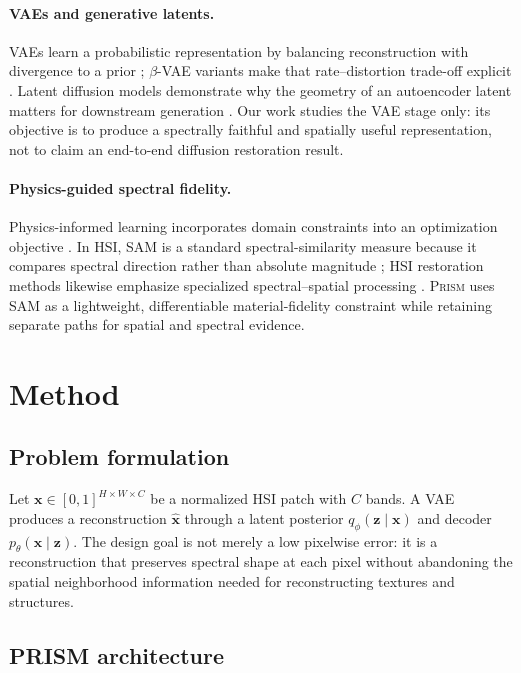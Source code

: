 \documentclass{article}
\newcommand{\prism}{\textsc{Prism}}
\begin{document}
\paragraph{VAEs and generative latents.}
VAEs learn a probabilistic representation by balancing reconstruction with divergence to a prior \citep{kingma2014vae}; $\beta$-VAE variants make that rate--distortion trade-off explicit \citep{higgins2017betavae}. Latent diffusion models demonstrate why the geometry of an autoencoder latent matters for downstream generation \citep{rombach2022ldm}. Our work studies the VAE stage only: its objective is to produce a spectrally faithful and spatially useful representation, not to claim an end-to-end diffusion restoration result.

\paragraph{Physics-guided spectral fidelity.}
Physics-informed learning incorporates domain constraints into an optimization objective \citep{raissi2019pinn}. In HSI, SAM is a standard spectral-similarity measure because it compares spectral direction rather than absolute magnitude \citep{kruse1993sips}; HSI restoration methods likewise emphasize specialized spectral--spatial processing \citep{chang2019hsidenet,fu2024sst}. \prism{} uses SAM as a lightweight, differentiable material-fidelity constraint while retaining separate paths for spatial and spectral evidence.

\section{Method}

\subsection{Problem formulation}

Let $\mathbf{x}\in[0,1]^{H\times W\times C}$ be a normalized HSI patch with $C$ bands. A VAE produces a reconstruction $\hat{\mathbf{x}}$ through a latent posterior $q_\phi(\mathbf{z}\mid\mathbf{x})$ and decoder $p_\theta(\mathbf{x}\mid\mathbf{z})$. The design goal is not merely a low pixelwise error: it is a reconstruction that preserves spectral shape at each pixel without abandoning the spatial neighborhood information needed for reconstructing textures and structures.

\subsection{PRISM architecture}
\end{document}
